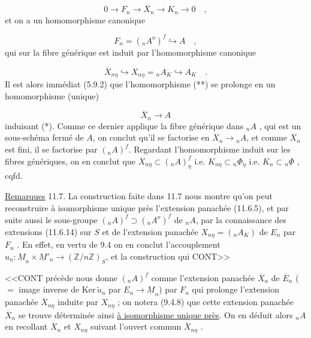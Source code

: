 \begin{equation*}
0 \longrightarrow F_n \longrightarrow \overline{X}_n \longrightarrow K_n \longrightarrow 0 \quad ,
\end{equation*}
et on a un homomorphisme canonique

\begin{equation}\tag{*}
F_n = ({}_nA^o)^f \hookrightarrow A \quad ,
\end{equation}
qui sur la fibre générique est induit par l'homomorphisme canonique

\begin{equation}\tag{**}
\overline{X}_{n\eta} \hookrightarrow X_{n\eta} = {}_nA_K \hookrightarrow A_K \quad .
\end{equation}
Il est alors immédiat (5.9.2) que l'homomorphisme (**) se prolonge en un homomorphisme (unique)

\begin{equation}\tag{***}
\overline{X}_n \longrightarrow A
\end{equation}
induisant (*). Comme ce dernier applique la fibre générique dans ${}_nA$ , qui est un sous-schéma fermé de $A$, on conclut qu'il se factorise en $\overline{X}_n \longrightarrow {}_nA$, et comme $\overline{X}_n$ est fini, il se factorise par $({}_nA)^f$. Regardant l'homomorphisme induit sur les fibres génériques, on en conclut que $\overline{X}_{n\eta} \subset ({}_nA)^f_\eta$ i.e. $K_{n\eta} \subset {}_n\Phi_\eta$ i.e. $K_n \subset {}_n\Phi$ , cqfd.

\underline{Remarques} 11.7. La construction faite dans 11.7 nous montre qu'on peut reconstruire à isomorphisme unique près l'extension panachée (11.6.5), et par suite aussi le sous-groupe $({}_nA)^f \supset ({}_nA^o)^f$ de ${}_nA$, par la connaissance des extensions (11.6.14) sur $S$ et de l'extension panachée $X_{n\eta} = ({}_nA_K)$ de $E_n$ par $F_n$ . En effet, en vertu de 9.4 on en conclut l'accouplement $u_n : \underline{M}_n \times \underline{M}'_n \longrightarrow (\mathbb{Z}/n\mathbb{Z})_S$, et la construction qui CONT>>



<<CONT précède nous donne $({}_nA)^f$ comme l'extension panachée $\overline{X}_n$ de $\overline{E}_n$ ($=$ image inverse de $\mathrm{Ker}\,\widetilde{u}_n$ par $E_n \longrightarrow \underline{M}_n$) par $F_n$ qui prolonge l'extension panachée $\overline{X}_{n\eta}$ induite par $X_{n\eta}$ ; on notera (9.4.8) que cette extension panachée $\overline{X}_n$ se trouve déterminée ainsi \underline{à isomorphisme unique près}. On en déduit alors ${}_nA$ en recollant $\overline{X}_n$ et $X_{n\eta}$ suivant l'ouvert commun $\overline{X}_{n\eta}$ .

